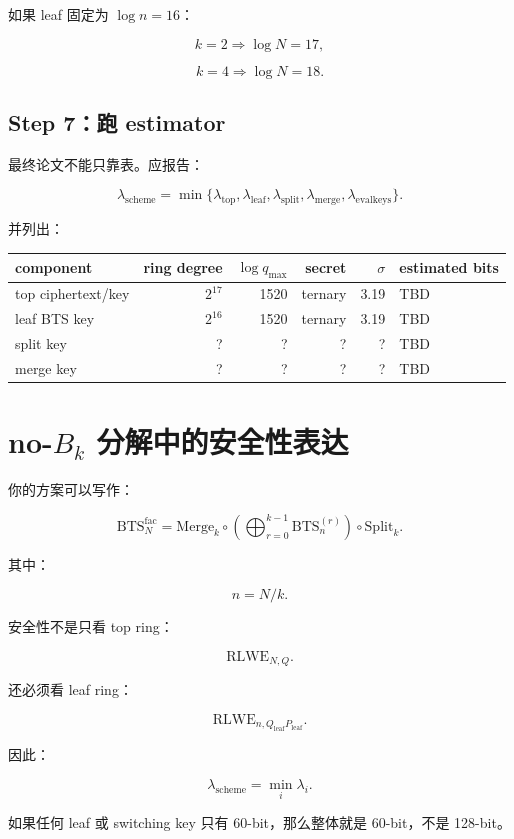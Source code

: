 \documentclass[UTF8,11pt,a4paper]{ctexart}
\begin{document}
如果 leaf 固定为 $\log n=16$：

\[
k=2 \Rightarrow \log N=17,
\]

\[
k=4 \Rightarrow \log N=18.
\]

\subsection{Step 7：跑 estimator}

最终论文不能只靠表。应报告：

\[
\lambda_{\mathrm{scheme}}
=
\min\{
\lambda_{\mathrm{top}},
\lambda_{\mathrm{leaf}},
\lambda_{\mathrm{split}},
\lambda_{\mathrm{merge}},
\lambda_{\mathrm{evalkeys}}
\}.
\]

并列出：

\begin{center}
\begin{tabular}{lrrrrl}
\toprule
component & ring degree & $\log q_{\max}$ & secret & $\sigma$ & estimated bits \\
\midrule
top ciphertext/key & $2^{17}$ & 1520 & ternary & 3.19 & TBD \\
leaf BTS key & $2^{16}$ & 1520 & ternary & 3.19 & TBD \\
split key & ? & ? & ? & ? & TBD \\
merge key & ? & ? & ? & ? & TBD \\
\bottomrule
\end{tabular}
\end{center}

\section{no-$B_k$ 分解中的安全性表达}

你的方案可以写作：

\[
\mathrm{BTS}^{\mathrm{fac}}_N
=
\mathrm{Merge}_k
\circ
\left(
\bigoplus_{r=0}^{k-1}\mathrm{BTS}_n^{(r)}
\right)
\circ
\mathrm{Split}_k.
\]

其中：

\[
n=N/k.
\]

安全性不是只看 top ring：

\[
\mathrm{RLWE}_{N,Q}.
\]

还必须看 leaf ring：

\[
\mathrm{RLWE}_{n,Q_{\mathrm{leaf}}P_{\mathrm{leaf}}}.
\]

因此：

\[
\boxed{
\lambda_{\mathrm{scheme}}
=
\min_i \lambda_i.
}
\]

如果任何 leaf 或 switching key 只有 60-bit，那么整体就是 60-bit，不是 128-bit。
\end{document}
